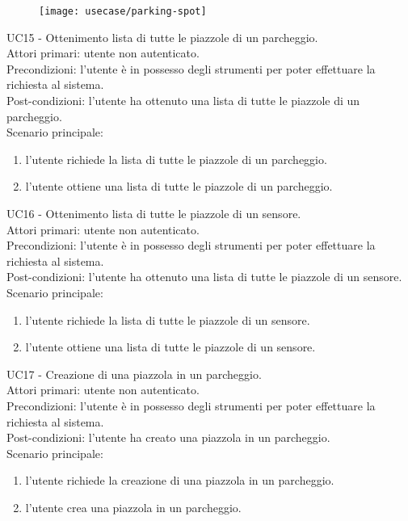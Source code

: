 \leavevmode\newline
\begin{figure}[!h]
    \centering
    \texttt{[image: usecase/parking-spot]}
\end{figure}
UC15 - Ottenimento lista di tutte le piazzole di un parcheggio.
\\
Attori primari: utente non autenticato.
\\
Precondizioni: l'utente è in possesso degli strumenti per poter effettuare la richiesta al sistema.
\\
Post-condizioni: l'utente ha ottenuto una lista di tutte le piazzole di un parcheggio.
\\
Scenario principale:
\begin{enumerate}
    \item l'utente richiede la lista di tutte le piazzole di un parcheggio.
    \item l'utente ottiene una lista di tutte le piazzole di un parcheggio.
\end{enumerate}
\leavevmode\newline
UC16 - Ottenimento lista di tutte le piazzole di un sensore.
\\
Attori primari: utente non autenticato.
\\
Precondizioni: l'utente è in possesso degli strumenti per poter effettuare la richiesta al sistema.
\\
Post-condizioni: l'utente ha ottenuto una lista di tutte le piazzole di un sensore.
\\
Scenario principale:
\begin{enumerate}
    \item l'utente richiede la lista di tutte le piazzole di un sensore.
    \item l'utente ottiene una lista di tutte le piazzole di un sensore.
\end{enumerate}
\leavevmode\newline
UC17 - Creazione di una piazzola in un parcheggio.
\\
Attori primari: utente non autenticato.
\\
Precondizioni: l'utente è in possesso degli strumenti per poter effettuare la richiesta al sistema.
\\
Post-condizioni: l'utente ha creato una piazzola in un parcheggio.
\\
Scenario principale:
\begin{enumerate}
    \item l'utente richiede la creazione di una piazzola in un parcheggio.
    \item l'utente crea una piazzola in un parcheggio.
\end{enumerate}
